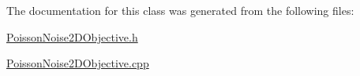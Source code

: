 The documentation for this class was generated from the following files\+:\begin{DoxyCompactItemize}
\item 
\hyperlink{PoissonNoise2DObjective_8h}{Poisson\+Noise2\+D\+Objective.\+h}\item 
\hyperlink{PoissonNoise2DObjective_8cpp}{Poisson\+Noise2\+D\+Objective.\+cpp}\end{DoxyCompactItemize}

